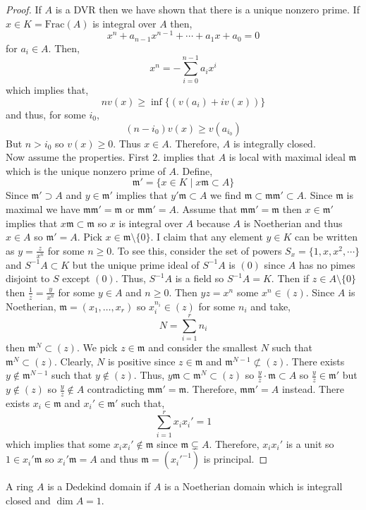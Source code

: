 \documentclass[12pt]{article}
\newcommand{\Frac}[1]{\mathrm{Frac}\left(#1\right)}
\newcommand{\m}{\mathfrak{m}}
\theoremstyle{remark}
\theoremstyle{definition}
\newenvironment{definition}[1][Definition:]{\begin{trivlist}
\item[\hskip \labelsep {\bfseries #1}]}{\end{trivlist}}
\begin{document}
\begin{proof}
If $A$ is a DVR then we have shown that there is a unique nonzero prime. If $x \in K = \Frac{A}$ is integral over $A$ then,
\[ x^n + a_{n-1} x^{n-1} + \cdots + a_1 x + a_0 = 0 \]
for $a_i \in A$. Then,
\[ x^n = - \sum_{i = 0}^{n - 1} a_i x^i \]
which implies that,
\[ n v(x) \ge \inf\{(v(a_i) + i v(x))\} \]
and thus, for some $i_0$,
\[ (n - i_0) v(x) \ge v(a_{i_0}) \]
But $ n > i_0$ so $v(x) \ge 0$. Thus $x \in A$. Therefore, $A$ is integrally closed.
\bigskip\\
Now assume the properties. First $2.$ implies that $A$ is local with maximal ideal $\m$ which is the unique nonzero prime of $A$. Define,
\[ \m' = \{ x \in K \mid x \m \subset A \} \]
Since $\m' \supset A$ and $y \in \m'$ implies that $y' \m \subset A$ we find $\m \subset \m \m' \subset A$. Since $\m$ is maximal we have $\m \m' = \m$ or $\m \m' = A$. Assume that $\m \m' = \m$ then $x \in \m'$ implies that $x \m \subset \m$ so $x$ is integral over $A$ because $A$ is Noetherian and thus $x \in A$ so $\m' = A$. Pick $x \in \m \setminus \{0\}$. I claim that any element $y \in K$ can be written as $y = \frac{z}{x^n}$ for some $n \ge 0$. To see this, consider the set of powers $S_x = \{1, x, x^2, \cdots \}$ and $S^{-1} A \subset K$ but the unique prime ideal of $S^{-1} A$ is $(0)$ since $A$ has no pimes disjoint to $S$ except $(0)$. Thus, $S^{-1} A$ is a field so $S^{-1} A = K$. Then if $z \in A \setminus \{ 0 \}$ then $\frac{1}{z} = \frac{y}{x^n}$ for some $y \in A$ and $n \ge 0$. Then $yz = x^n$ some $x^n \in (z)$. Since $A$ is Noetherian, $\m = (x_1, \dots, x_r)$ so $x_i^{n_i} \in (z)$ for some $n_i$ and take,
\[ N = \sum_{i = 1}^r n_i \]
then $\m^N \subset (z)$. We pick $z \in \m$ and consider the smallest $N$ such that $\m^N \subset (z)$. Clearly, $N$ is positive since $z \in \m$ and $\m^{N - 1} \not\subset (z)$. There exists $y \notin \m^{N-1}$ such that $y \notin (z)$. Thus, $y \m \subset  \m^N \subset (z)$ so $\frac{y}{z} \cdot \m \subset A$ so $\frac{y}{z} \in \m'$ but $y \notin (z)$ so $\frac{y}{z} \notin A$ contradicting $\m \m' = \m$. Therefore, $\m \m' = A$ instead. There exists $x_i \in \m$ and $x_i' \in \m'$ such that,
\[ \sum_{i = 1}^r x_i x_i' = 1 \]
which implies that some $x_i x_i' \notin \m$ since $\m \subsetneq A$. Therefore, $x_i x_i'$ is a unit  so $1 \in x_i' \m$ so $x_i' \m = A$ and thus $\m = (x_i'^{-1})$ is principal. 
\end{proof}

\begin{definition}
A ring $A$ is a Dedekind domain if $A$ is a Noetherian domain which is integrall closed and $\dim{A} = 1$. 
\end{definition}
\end{document}
